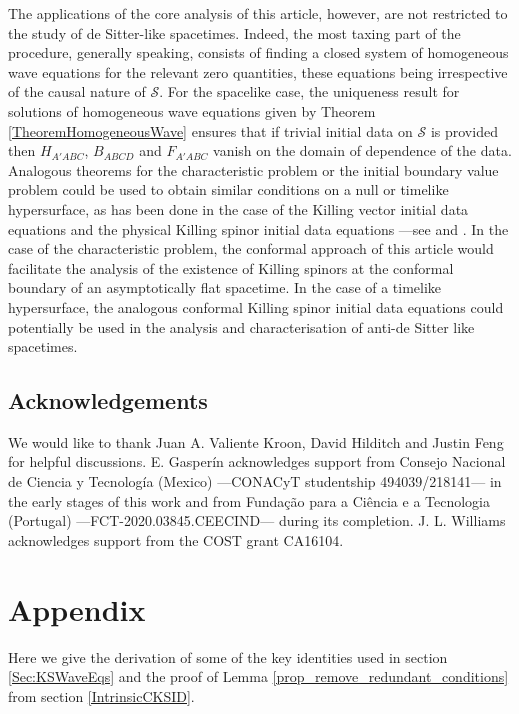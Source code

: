 \documentclass[10pt,a4paper]{article}
\theoremstyle{plain}
\begin{document}
The applications of the core analysis of this article, however, are
not restricted to the study of de Sitter-like spacetimes. Indeed, the
most taxing part of the procedure, generally speaking, consists of finding a closed system
of homogeneous wave equations for the relevant zero quantities, these equations being irrespective of the causal nature
of $\mathcal{S}$. For the spacelike case, the uniqueness result for solutions of homogeneous wave equations given by Theorem \ref{TheoremHomogeneousWave} ensures that if
trivial initial data on $\mathcal{S}$ is provided then $H_{A'ABC}$,
$B_{ABCD}$ and $F_{A'ABC}$ vanish on the domain of dependence of the
data.  Analogous theorems for the characteristic problem or the
initial boundary value problem could be used to obtain similar
conditions on a null or timelike hypersurface, as has been done in the
case of the Killing vector initial data equations and the physical
Killing spinor initial data equations ---see \cite{Pae14a,
  ColRacVal18} and \cite{CarVal18}.  In the case of the characteristic
problem, the conformal approach of this article would facilitate the
analysis of the existence of Killing spinors at the conformal boundary
of an asymptotically flat spacetime.  In the case of a timelike
hypersurface, the analogous conformal Killing spinor initial data
equations could potentially be used in the analysis and characterisation of
anti-de Sitter like spacetimes.


\subsection*{Acknowledgements}

We would like to thank Juan A. Valiente Kroon, David Hilditch and
Justin Feng for helpful discussions.  E. Gasper\'in acknowledges
support from Consejo Nacional de Ciencia y Tecnolog\'ia (Mexico)
---CONACyT studentship 494039/218141--- in the early stages of this
work and from Fundaç\~ao para a Ci\^encia e a Tecnologia (Portugal)
---FCT-2020.03845.CEECIND--- during its completion. J. L. Williams
acknowledges support from the COST grant CA16104.  \appendix

\section{Appendix}\label{Appendix_A}

Here we give the derivation of some of the key identities used in
section \ref{Sec:KSWaveEqs} and the proof of Lemma
\ref{prop_remove_redundant_conditions} from section
\ref{IntrinsicCKSID}.
\end{document}
